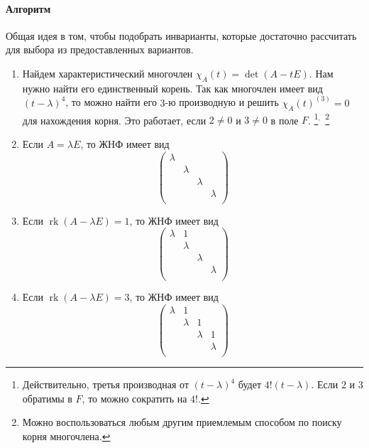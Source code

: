 \documentclass{article}
\newcommand{\rk}{\operatorname{rk}}
\begin{document}
\paragraph{Алгоритм}

Общая идея в том, чтобы подобрать инварианты, которые достаточно рассчитать для выбора из предоставленных вариантов.
\begin{enumerate}
\item Найдем характеристический многочлен $\chi_A(t) = \det(A - t E)$.
Нам нужно найти его единственный корень.
Так как многочлен имеет вид $(t-\lambda)^4$, то можно найти его $3$-ю производную и решить $\chi_A(t)^{(3)} = 0$ для нахождения корня.
Это работает, если $2\neq 0$ и $3\neq 0$ в поле $F$.%
\footnote{Действительно, третья производная от  $(t-\lambda)^4$ будет $4! (t - \lambda)$.
Если $2$ и $3$ обратимы в $F$, то можно сократить на $4!$.}$%
{}^{,\,}$%
\footnote{Можно воспользоваться любым другим приемлемым способом по поиску корня многочлена.}

\item Если $A = \lambda E$, то ЖНФ имеет вид
\[
\begin{pmatrix}
{\lambda}&{}&{}&{}\\
{}&{\lambda}&{}&{}\\
{}&{}&{\lambda}&{}\\
{}&{}&{}&{\lambda}\\
\end{pmatrix}
\]

\item Если $\rk(A-\lambda E) = 1$, то ЖНФ имеет вид
\[
\begin{pmatrix}
{\lambda}&{1}&{}&{}\\
{}&{\lambda}&{}&{}\\
{}&{}&{\lambda}&{}\\
{}&{}&{}&{\lambda}\\
\end{pmatrix}
\]

\item Если $\rk (A - \lambda E) = 3$, то ЖНФ имеет вид
\[
\begin{pmatrix}
{\lambda}&{1}&{}&{}\\
{}&{\lambda}&{1}&{}\\
{}&{}&{\lambda}&{1}\\
{}&{}&{}&{\lambda}\\
\end{pmatrix}
\]


\end{enumerate}
\end{document}
